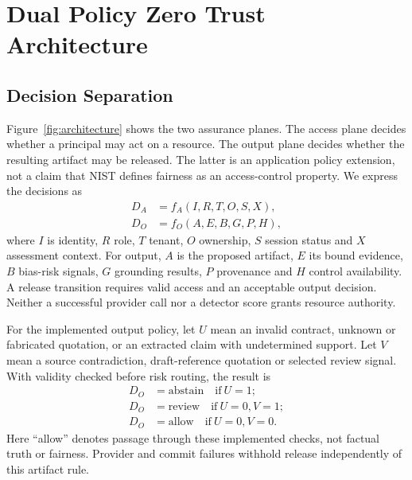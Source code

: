 \documentclass[conference]{IEEEtran}
\begin{document}
\section{Dual Policy Zero Trust Architecture}
\subsection{Decision Separation}
Figure~\ref{fig:architecture} shows the two assurance planes. The access plane decides whether a principal may act on a resource. The output plane decides whether the resulting artifact may be released. The latter is an application policy extension, not a claim that NIST defines fairness as an access-control property. We express the decisions as
\begin{align}
D_A &= f_A(I,R,T,O,S,X), \\
D_O &= f_O(A,E,B,G,P,H),
\end{align}
where $I$ is identity, $R$ role, $T$ tenant, $O$ ownership, $S$ session status and $X$ assessment context. For output, $A$ is the proposed artifact, $E$ its bound evidence, $B$ bias-risk signals, $G$ grounding results, $P$ provenance and $H$ control availability. A release transition requires valid access and an acceptable output decision. Neither a successful provider call nor a detector score grants resource authority.

For the implemented output policy, let $U$ mean an invalid contract, unknown or fabricated quotation, or an extracted claim with undetermined support. Let $V$ mean a source contradiction, draft-reference quotation or selected review signal. With validity checked before risk routing, the result is
\begin{equation}
\begin{aligned}
D_O&=\mathrm{abstain}\quad\mathrm{if}\ U=1;\\
D_O&=\mathrm{review}\quad\mathrm{if}\ U=0,V=1;\\
D_O&=\mathrm{allow}\quad\mathrm{if}\ U=0,V=0.
\end{aligned}
\label{eq:output-rule}
\end{equation}
Here ``allow'' denotes passage through these implemented checks, not factual truth or fairness. Provider and commit failures withhold release independently of this artifact rule.
\end{document}

